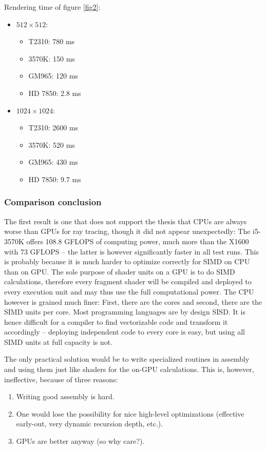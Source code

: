 \documentclass[english,fleqn,10pt,twocolumn]{article}
\begin{document}
Rendering time of figure \ref{fig2}:
\begin{itemize}
    \item $512 \times 512$:
        \begin{itemize}
            \item T2310: 780 ms
            \item 3570K: 150 ms
            \item GM965: 120 ms
            \item HD 7850: 2.8 ms
        \end{itemize}
    \item $1024 \times 1024$:
        \begin{itemize}
            \item T2310: 2600 ms
            \item 3570K: 520 ms
            \item GM965: 430 ms
            \item HD 7850: 9.7 ms
        \end{itemize}
\end{itemize}

\subsubsection{Comparison conclusion}

The first result is one that does not support the thesis that CPUs are always worse than GPUs for ray tracing, though it did not appear unexpectedly: The i5-3570K offers 108.8 GFLOPS of computing power, much more than the X1600 with
73 GFLOPS -- the latter is however significantly faster in all test runs. This is probably because it is much harder to optimize correctly for SIMD on CPU than on GPU. The sole purpose of shader units on a GPU is to do SIMD
calculations, therefore every fragment shader will be compiled and deployed to every execution unit and may thus use the full computational power. The CPU however is grained much finer: First, there are the cores and second, there are
the SIMD units per core. Most programming languages are by design SISD. It is hence difficult for a compiler to find vectorizable code and transform it accordingly -- deploying independent code to every core is easy, but using all
SIMD units at full capacity is not.

The only practical solution would be to write specialized routines in assembly and using them just like shaders for the on-GPU calculations. This is, however, ineffective, because of three reasons:
\begin{enumerate}
    \item Writing good assembly is hard.
    \item One would lose the possibility for nice high-level optimizations (effective early-out, very dynamic recursion depth, etc.).
    \item GPUs are better anyway (so why care?).
\end{enumerate}



\end{document}
